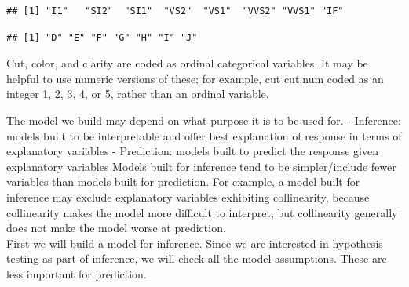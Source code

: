 \documentclass[
]{book}
\newenvironment{Shaded}{\begin{snugshade}}{\end{snugshade}}
\newcommand{\FunctionTok}[1]{\textcolor[rgb]{0.00,0.00,0.00}{#1}}
\newcommand{\NormalTok}[1]{#1}
\newcommand{\OtherTok}[1]{\textcolor[rgb]{0.56,0.35,0.01}{#1}}
\newcommand{\SpecialCharTok}[1]{\textcolor[rgb]{0.00,0.00,0.00}{#1}}
\begin{document}
\begin{verbatim}
## [1] "I1"   "SI2"  "SI1"  "VS2"  "VS1"  "VVS2" "VVS1" "IF"
\end{verbatim}

\begin{Shaded}
\end{Shaded}

\begin{verbatim}
## [1] "D" "E" "F" "G" "H" "I" "J"
\end{verbatim}

Cut, color, and clarity are coded as ordinal categorical variables. It may be helpful to use numeric versions of these; for example, cut cut.num coded as an integer 1, 2, 3, 4, or 5, rather than an ordinal variable.

\begin{Shaded}
\end{Shaded}

The model we build may depend on what purpose it is to be used for.
- Inference: models built to be interpretable and offer best explanation of response in terms of explanatory variables
- Prediction: models built to predict the response given explanatory variables
Models built for inference tend to be simpler/include fewer variables than models built for prediction. For example, a model built for inference may exclude explanatory variables exhibiting collinearity, because collinearity makes the model more difficult to interpret, but collinearity generally does not make the model worse at prediction.\\
First we will build a model for inference. Since we are interested in hypothesis testing as part of inference, we will check all the model assumptions. These are less important for prediction.
\end{document}
